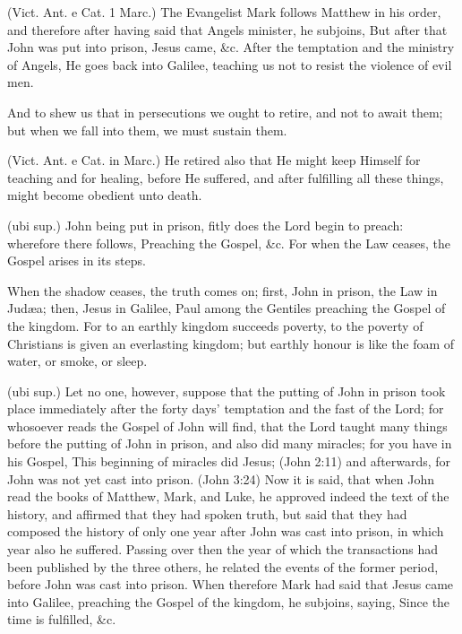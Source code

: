  (Vict. Ant. e Cat. 1 Marc.) The Evangelist Mark follows Matthew in his order, and therefore after having said that Angels minister, he subjoins, But after that John was put into prison, Jesus came, \&c. After the temptation and the ministry of Angels, He goes back into Galilee, teaching us not to resist the violence of evil men.

 And to shew us that in persecutions we ought to retire, and not to await them; but when we fall into them, we must sustain them.

 (Vict. Ant. e Cat. in Marc.) He retired also that He might keep Himself for teaching and for healing, before He suffered, and after fulfilling all these things, might become obedient unto death.

 (ubi sup.) John being put in prison, fitly does the Lord begin to preach: wherefore there follows, Preaching the Gospel, \&c. For when the Law ceases, the Gospel arises in its steps.

 When the shadow ceases, the truth comes on; first, John in prison, the Law in Judæa; then, Jesus in Galilee, Paul among the Gentiles preaching the Gospel of the kingdom. For to an earthly kingdom succeeds poverty, to the poverty of Christians is given an everlasting kingdom; but earthly honour is like the foam of water, or smoke, or sleep.

 (ubi sup.) Let no one, however, suppose that the putting of John in prison took place immediately after the forty days’ temptation and the fast of the Lord; for whosoever reads the Gospel of John will find, that the Lord taught many things before the putting of John in prison, and also did many miracles; for you have in his Gospel, This beginning of miracles did Jesus; (John 2:11) and afterwards, for John was not yet cast into prison. (John 3:24) Now it is said, that when John read the books of Matthew, Mark, and Luke, he approved indeed the text of the history, and affirmed that they had spoken truth, but said that they had composed the history of only one year after John was cast into prison, in which year also he suffered. Passing over then the year of which the transactions had been published by the three others, he related the events of the former period, before John was cast into prison. When therefore Mark had said that Jesus came into Galilee, preaching the Gospel of the kingdom, he subjoins, saying, Since the time is fulfilled, \&c.

